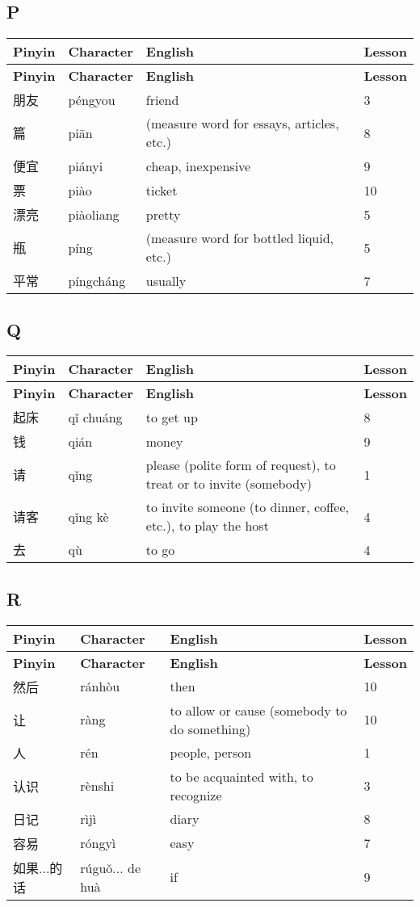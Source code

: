 \documentclass[12pt]{article}
\newcommand{\vocabitem}[4]{%
  #1 & #2 & #3 & #4 \\ \midrule
}
\begin{document}
\subsection*{P}
\begin{longtable}{P{\dimexpr\textwidth/4\relax}P{\dimexpr\textwidth/4\relax}P{\dimexpr\textwidth/4\relax}P{\dimexpr\textwidth/4\relax}}
\toprule
\textbf{Pinyin} & \textbf{Character} & \textbf{English} & \textbf{Lesson} \\
\midrule
\endfirsthead
\toprule
\textbf{Pinyin} & \textbf{Character} & \textbf{English} & \textbf{Lesson} \\
\midrule
\endhead
\vocabitem{朋友}{péngyou}{friend}{3}
\vocabitem{篇}{piān}{(measure word for essays, articles, etc.)}{8}
\vocabitem{便宜}{piányi}{cheap, inexpensive}{9}
\vocabitem{票}{piào}{ticket}{10}
\vocabitem{漂亮}{piàoliang}{pretty}{5}
\vocabitem{瓶}{píng}{(measure word for bottled liquid, etc.)}{5}
\vocabitem{平常}{píngcháng}{usually}{7}
\end{longtable}

\subsection*{Q}
\begin{longtable}{P{\dimexpr\textwidth/4\relax}P{\dimexpr\textwidth/4\relax}P{\dimexpr\textwidth/4\relax}P{\dimexpr\textwidth/4\relax}}
\toprule
\textbf{Pinyin} & \textbf{Character} & \textbf{English} & \textbf{Lesson} \\
\midrule
\endfirsthead
\toprule
\textbf{Pinyin} & \textbf{Character} & \textbf{English} & \textbf{Lesson} \\
\midrule
\endhead
\vocabitem{起床}{qǐ chuáng}{to get up}{8}
\vocabitem{钱}{qián}{money}{9}
\vocabitem{请}{qǐng}{please (polite form of request), to treat or to invite (somebody)}{1}
\vocabitem{请客}{qǐng kè}{to invite someone (to dinner, coffee, etc.), to play the host}{4}
\vocabitem{去}{qù}{to go}{4}
\end{longtable}


\subsection*{R}
\begin{longtable}{P{\dimexpr\textwidth/4\relax}P{\dimexpr\textwidth/4\relax}P{\dimexpr\textwidth/4\relax}P{\dimexpr\textwidth/4\relax}}
\toprule
\textbf{Pinyin} & \textbf{Character} & \textbf{English} & \textbf{Lesson} \\
\midrule
\endfirsthead
\toprule
\textbf{Pinyin} & \textbf{Character} & \textbf{English} & \textbf{Lesson} \\
\midrule
\endhead
\vocabitem{然后}{ránhòu}{then}{10}
\vocabitem{让}{ràng}{to allow or cause (somebody to do something)}{10}
\vocabitem{人}{rén}{people, person}{1}
\vocabitem{认识}{rènshi}{to be acquainted with, to recognize}{3}
\vocabitem{日记}{rìjì}{diary}{8}
\vocabitem{容易}{róngyì}{easy}{7}
\vocabitem{如果...的话}{rúguǒ... de huà}{if}{9}
\end{longtable}
\end{document}
